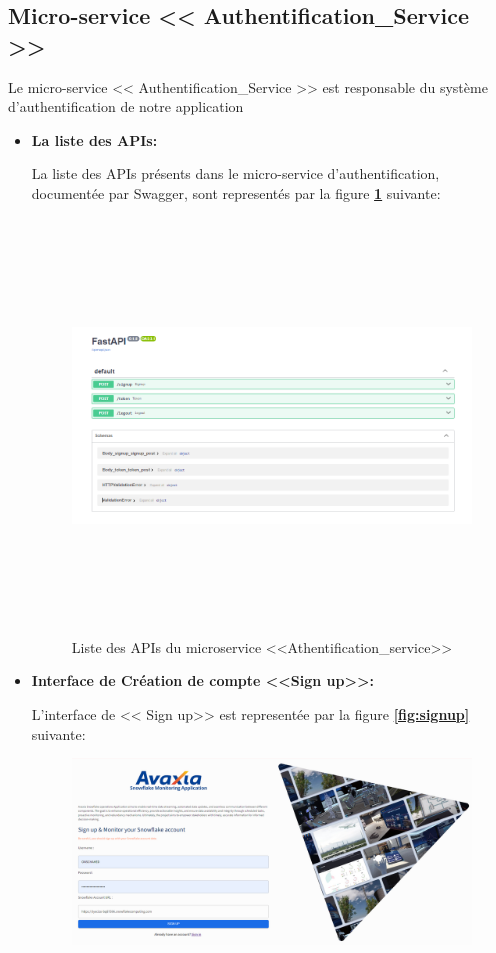 \subsection{Micro-service << Authentification\_Service >>}
\par Le micro-service << Authentification\_Service >> est responsable du système d'authentification de notre application 
\begin{itemize}
    \item \textbf{La liste des APIs:}
        \par La liste des APIs présents dans le micro-service d'authentification, documentée par Swagger, sont representés par la figure \textbf{\ref{fig:apiAuth}} suivante:
        \begin{figure}[H]
            \centering
            \includegraphics[width =1\linewidth, height=11cm]{img/captures/auth_apis.PNG}
            \caption{Liste des APIs du microservice <<Athentification\_service>> }
                \label{fig:apiAuth}
        \end{figure}
        \item \textbf{Interface de Création de compte <<Sign up>>:}
        \par L'interface de << Sign up>> est representée par la figure \textbf{\ref{fig:signup}} suivante:
        \begin{figure}[H]
            \centering
            \includegraphics[width =1\linewidth]{img/captures/auth/signup.png}

\end{figure}
\end{itemize}

